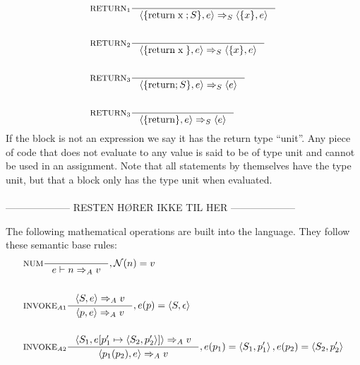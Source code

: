 \begin{align*}
&\inference[$\text{RETURN}_{1}$]{}
                   {\Braket{\{\Treturn \Tx;S\},e} \Rightarrow_S \Braket{\{x\},e}}
\\\\
&\inference[$\text{RETURN}_{2}$]{}
                   {\Braket{\{\Treturn \Tx\},e} \Rightarrow_S \Braket{\{x\},e}}
\\\\
&\inference[$\text{RETURN}_{3}$]{}
                   {\Braket{\{\Treturn;S\},e} \Rightarrow_S \Braket{e}}
\\\\
&\inference[$\text{RETURN}_{3}$]{}
                   {\Braket{\{\Treturn\},e} \Rightarrow_S \Braket{e}}
\end{align*}
If the block is not an expression we say it has the return type \enquote{unit}. Any piece of code that does not evaluate to any value is said to be of type unit and cannot be used in an assignment. Note that all statements by themselves have the type unit, but that a block only has the type unit when evaluated.
\\\\
-------------------- RESTEN HØRER IKKE TIL HER --------------------

The following mathematical operations are built into the language. They follow these semantic base rules:
\begin{align*}
&\inference[NUM]{}
                  {e \vdash n \Rightarrow_A v}
                  {, \mathcal{N}(n) = v}
\\\\
&\inference[$\text{INVOKE}_{A1}$]{\Braket{S,e} \Rightarrow_A v}
                  {\Braket{p,e} \Rightarrow_A v}
                  {,e(p) = \Braket{S,\epsilon}}
\\\\
&\inference[$\text{INVOKE}_{A2}$]{\Braket{S_1,e[p_1' \mapsto \Braket{S_2,p_2'}]} \Rightarrow_A v}
                  {\Braket{p_1(p_2),e} \Rightarrow_A v}
                  {,e(p_1) = \Braket{S_1,p_1'}, e(p_2) = \Braket{S_2,p_2'}}
\\\\
\end{align*}


